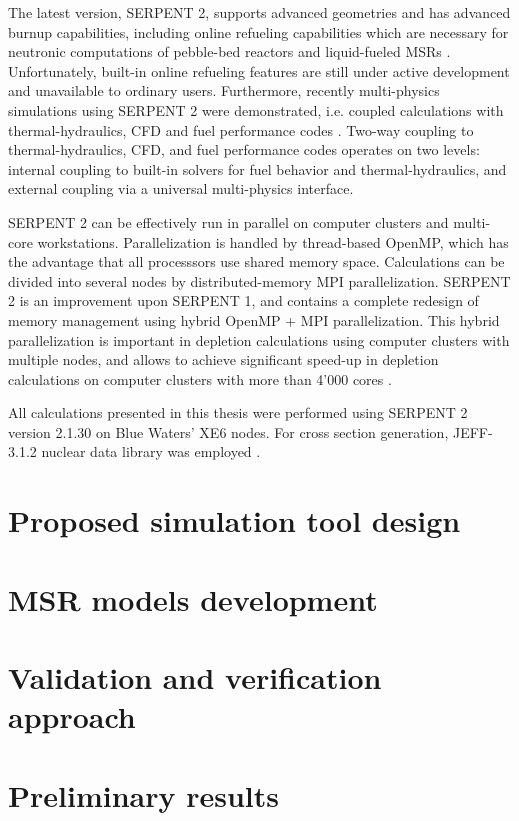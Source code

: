 The latest version, SERPENT 2, supports advanced geometries and has advanced burnup capabilities, including online refueling capabilities which are necessary for neutronic computations of pebble-bed reactors and liquid-fueled \glspl{MSR} \cite{aufiero_extended_2013}. Unfortunately, built-in online refueling features are still under active development and unavailable to ordinary users. Furthermore, recently multi-physics simulations using SERPENT 2 were demonstrated, i.e. coupled calculations with thermal-hydraulics, \gls{CFD} and fuel performance codes \cite{leppanen_numerical_2015}. Two-way coupling to thermal-hydraulics, \gls{CFD}, and fuel performance codes operates on two levels: internal coupling to built-in solvers for fuel behavior and thermal-hydraulics, and external coupling via a universal multi-physics interface. 

SERPENT 2 can be effectively run in parallel on computer clusters and multi-core workstations. Parallelization is handled by thread-based OpenMP, which has the advantage that all processsors use shared memory space. Calculations can be divided into several nodes by distributed-memory \gls{MPI} parallelization. SERPENT 2  is an improvement upon SERPENT 1, and contains a complete redesign of memory management using hybrid OpenMP \cite{dagum_openmp_1998} + \gls{MPI} parallelization.  This hybrid parallelization is important in depletion calculations using computer clusters with multiple nodes, and allows to achieve significant speed-up in depletion calculations on computer clusters with more than 4'000 cores \cite{leppanen_serpent_2015}. 

All calculations presented in this thesis were performed using SERPENT 2 version 2.1.30 on Blue Waters’ XE6 nodes. For cross section generation, JEFF-3.1.2 nuclear data library was employed \cite{oecd/nea_data_bank_jeff-3.1.2_2014}. 
\section{Proposed simulation tool design}

\section{MSR models development}

\section{Validation and verification approach}

\section{Preliminary results}
